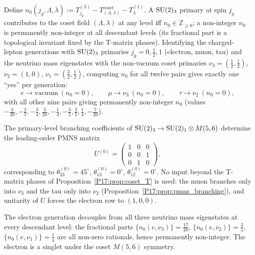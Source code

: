 \begin{proposition}
\label{P17:prop:pmns_branching}
Define $n_0(j_g,\Lambda,\lambda):=T^{(3)}_{j_g}-T^{\mathrm{coset}}_{(\Lambda,\lambda)}-T^{(1)}_\lambda$.
A $\mathrm{SU}(2)_3$ primary at spin $j_g$ contributes to the coset field
$(\Lambda,\lambda)$ at any level iff $n_0\in\mathbb{Z}_{\geq0}$; a
non-integer $n_0$ is permanently non-integer at all descendant levels
(its fractional part is a topological invariant fixed by the T-matrix
phases). Identifying the charged-lepton generations with
$\mathrm{SU}(2)_3$ primaries $j_g=0,\tfrac12,1$ (electron, muon, tau) and the
neutrino mass eigenstates with the non-vacuum coset primaries
$\nu_3=(\tfrac12,\tfrac12)$, $\nu_2=(1,0)$, $\nu_1=(\tfrac32,\tfrac12)$,
computing $n_0$ for all twelve pairs gives exactly one ``yes'' per
generation:
\[
  e\to\text{vacuum}\ (n_0=0), \qquad
  \mu\to\nu_3\ (n_0=0), \qquad
  \tau\to\nu_2\ (n_0=0),
\]
with all other nine pairs giving permanently non-integer $n_0$
(values $-\tfrac{3}{20},-\tfrac25,-\tfrac34,\tfrac{3}{20},-\tfrac14,
-\tfrac35,\tfrac25,\tfrac14,-\tfrac{7}{20}$).
\end{proposition}

\begin{theorem}
\label{P17:thm:pmns_permutation}
The primary-level branching coefficients of
$\mathrm{SU}(2)_3\to\mathrm{SU}(2)_1\otimes M(5,6)$ determine the leading-order PMNS
matrix
\begin{equation}
  \boxed{U^{(0)}=\begin{pmatrix}1&0&0\\0&0&1\\0&1&0\end{pmatrix},}
  \label{P17:eq:PMNS_LO}
\end{equation}
corresponding to $\theta_{23}^{(0)}=45^\circ$, $\theta_{13}^{(0)}=0^\circ$,
$\theta_{12}^{(0)}=0^\circ$. No input beyond the T-matrix phases of
Proposition~\ref{P17:prop:coset_T} is used: the muon branches only into
$\nu_3$ and the tau only into $\nu_2$ (Proposition~\ref{P17:prop:pmns_branching}),
and unitarity of $U$ forces the electron row to $(1,0,0)$.
\end{theorem}

\begin{corollary}
\label{P17:cor:electron_decouple}
The electron generation decouples from all three neutrino mass
eigenstates at every descendant level: the fractional parts
$\{n_0(e,\nu_3)\}=\tfrac{17}{20}$, $\{n_0(e,\nu_2)\}=\tfrac35$,
$\{n_0(e,\nu_1)\}=\tfrac14$ are all non-zero rationals, hence
permanently non-integer. The electron is a singlet under the coset
$M(5,6)$ symmetry.
\end{corollary}

